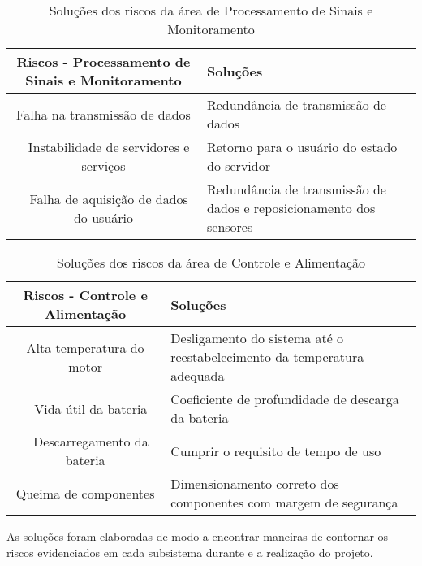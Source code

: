 \begin{table}[h]
\centering
\vspace{0.5cm}
\begin{tabular}{|c|p{6cm}|}
\hline
Riscos - Processamento de Sinais e Monitoramento         & Soluções \\
\hline
Falha na transmissão de dados             & Redundância de transmissão de dados \\ 
Instabilidade de servidores e serviços    & Retorno para o usuário do estado do servidor \\ 
Falha de aquisição de dados do usuário    & Redundância de transmissão de dados e reposicionamento dos sensores \\
\hline
\end{tabular}
\caption{Soluções dos riscos da área de Processamento de Sinais e Monitoramento}
\label{tab:riscosubareacont}
\end{table}

\begin{table}[h]
\centering
\vspace{0.5cm}
\begin{tabular}{|c|p{8cm}|}
\hline
Riscos - Controle e Alimentação & Soluções \\
\hline
Alta temperatura do motor     & Desligamento do sistema até o reestabelecimento da temperatura adequada \\ 
Vida útil da bateria          & Coeficiente de profundidade de descarga da bateria \\ 
Descarregamento da bateria    & Cumprir o requisito de tempo de uso \\
Queima de componentes         & Dimensionamento correto dos componentes com margem de segurança \\
\hline
\end{tabular}
\caption{Soluções dos riscos da área de Controle e Alimentação}
\label{tab:riscosubareaalim}
\end{table}

As soluções foram elaboradas de modo a encontrar maneiras de contornar os riscos
evidenciados em cada subsistema durante e a realização do projeto.
